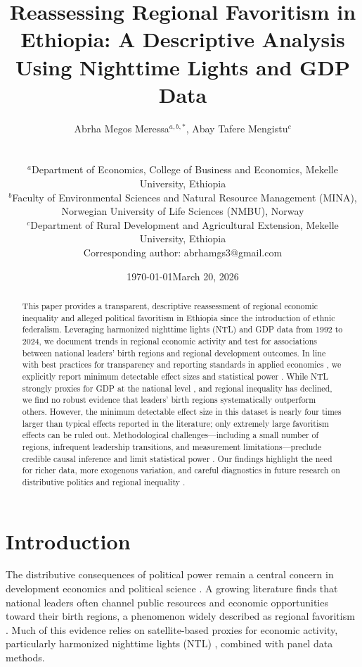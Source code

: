 \documentclass[12pt,a4paper]{article}
\title{Reassessing Regional Favoritism in Ethiopia: A Descriptive Analysis Using Nighttime Lights and GDP Data}
\author{\begin{tabular}{c}
		Abrha Megos Meressa$^{a,b,*}$,
		Abay Tafere Mengistu$^c$ \\
	\end{tabular} \\[1ex]
	\begin{tabular}{l}
		\small $^a$Department of Economics, College of Business and Economics, Mekelle University, Ethiopia \\
		\small $^b$Faculty of Environmental Sciences and Natural Resource Management (MINA), Norwegian University of Life Sciences (NMBU), Norway \\
		\small $^c$Department of Rural Development and Agricultural Extension, Mekelle University, Ethiopia \\
		\small *Corresponding author: abrhamgs3@gmail.com
\end{tabular}}
\date{\today}
\date{March 20, 2026}
\begin{document}
\maketitle


\begin{abstract}
This paper provides a transparent, descriptive reassessment of regional economic inequality and alleged political favoritism in Ethiopia since the introduction of ethnic federalism. Leveraging harmonized nighttime lights (NTL) and GDP data from 1992 to 2024, we document trends in regional economic activity and test for associations between national leaders’ birth regions and regional development outcomes. In line with best practices for transparency and reporting standards in applied economics \citep{ChristensenMiguel2018, Nosek2015}, we explicitly report minimum detectable effect sizes and statistical power \citep{Gerber2010}. While NTL strongly proxies for GDP at the national level \citep{Chen2011,Henderson2012,Li2023}, and regional inequality has declined, we find no robust evidence that leaders’ birth regions systematically outperform others. However, the minimum detectable effect size in this dataset is nearly four times larger than typical effects reported in the literature; only extremely large favoritism effects can be ruled out. Methodological challenges—including a small number of regions, infrequent leadership transitions, and measurement limitations—preclude credible causal inference and limit statistical power \citep{Angrist2009,Bertrand2004,Imbens2015}. Our findings highlight the need for richer data, more exogenous variation, and careful diagnostics in future research on distributive politics and regional inequality \citep{Bickenbach2016,WorldBank2024}.
\end{abstract}


\section{Introduction}

The distributive consequences of political power remain a central concern in development economics and political science \citep{PerssonTabellini2000}. A growing literature finds that national leaders often channel public resources and economic opportunities toward their birth regions, a phenomenon widely described as regional favoritism \citep{Hodler2014, BeiserMcGrath2021, Onana2024}. Much of this evidence relies on satellite-based proxies for economic activity, particularly harmonized nighttime lights (NTL) \citep{Chen2011, Henderson2012, Li2023, Gibson2021}, combined with panel data methods.
\end{document}
